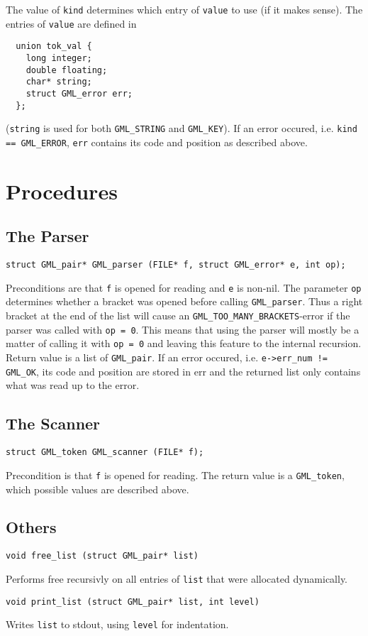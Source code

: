 \documentclass[10pt,oneside,a4paper]{article}
\begin{document}
\medskip\noindent
The value of \verb+kind+ determines which entry of \verb+value+ to use (if it
makes sense). The entries of \verb+value+ are defined in

\begin{verbatim}
  union tok_val {
    long integer;
    double floating;
    char* string;
    struct GML_error err;
  };
\end{verbatim}
(\verb+string+ is used for both \verb+GML_STRING+ and \verb+GML_KEY+). If an
error occured, i.e. \verb+kind == GML_ERROR+, \verb+err+ contains its code
and position as described above. 

\section{Procedures}
\subsection{The Parser}
\begin{verbatim}
struct GML_pair* GML_parser (FILE* f, struct GML_error* e, int op);
\end{verbatim}
Preconditions are that \verb+f+ is opened for reading and \verb+e+ is 
non-nil. The parameter \verb+op+ determines whether a bracket was opened 
before calling \verb+GML_parser+. Thus a right bracket at the end of the list 
will cause an \verb+GML_TOO_MANY_BRACKETS+-error if the parser was called with 
\verb+op = 0+. This means that using the parser will mostly be a matter
of calling it with \verb+op = 0+ and leaving this feature to the internal 
recursion. Return value is a list of \verb+GML_pair+. If an error occured, 
i.e. \verb+e->err_num != GML_OK+, its code and position are stored in err 
and the returned list only contains what was read up to the error.

\subsection{The Scanner}
\begin{verbatim}
struct GML_token GML_scanner (FILE* f);
\end{verbatim}
Precondition is that \verb+f+ is opened for reading. The return value is 
a \verb+GML_token+, which possible values are described above.

\subsection{Others}
\begin{verbatim}
void free_list (struct GML_pair* list)
\end{verbatim}
Performs free recursivly on all entries of \verb+list+ that were allocated 
dynamically. 
\begin{verbatim}
void print_list (struct GML_pair* list, int level)
\end{verbatim}
Writes \verb+list+ to stdout, using \verb+level+ for indentation.
\end{document}
